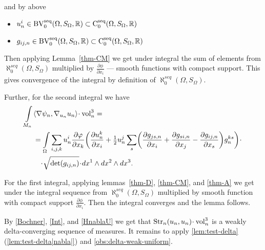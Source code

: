  and by above
 
  \begin{itemize}
  
  \item ${u^i_n}\in  \operatorname{BV_0^{seq}}(\Omega,S_\Omega,\mathbb{R})\subset\operatorname{C_0^{seq}}(\Omega,S_\Omega,\mathbb{R})$ 
 
 \item $g_{i j,n}\in   \operatorname{BV_0^{seq}}(\Omega,S_\Omega,\mathbb{R})\subset \operatorname{C_0^{seq}}(\Omega,S_\Omega,\mathbb{R})$
 
  \end{itemize}
  
Then applying Lemma~\ref{thm-CM} we get under integral the sum of elements from $\aleph_0^{seq}(\Omega,S_\Omega)$ multiplied by $\frac{\partial \phi}{\partial x_i}$ --- smooth functions with compact support.
This gives convergence of the integral by definition of  $\aleph_0^{seq}(\Omega,S_\Omega)$.
              

Further, for the second integral %
we have
\begin{align*}
\int\limits_{M_n}&\<\nabla\psi_n,\nabla_{u_n} u_n\>\cdot\vol^3_n=\\
&=\int\limits_{\Omega}  \sum_{i,j,k}u^i_n \frac{\partial \phi}{\partial x_k}
\biggl(\frac{\partial u^k_n}{\partial x_i} +\tfrac{1}{2}u^j_n\sum_s
\biggl(\frac{\partial g_{ js,n}}{\partial x_i}+\frac{\partial g_{si,n}}{\partial x_j}-\frac{\partial g_{i j,n}}{\partial x_s}\biggr) g^{ks}_n\biggr)\cdot 
\\
&\quad\cdot\sqrt{\op{det}(g_{i j,n})}\cdot dx^1\wedge dx^2\wedge dx^3.
\end{align*}


For the first integral,
 applying
lemmas~\ref{thm-D}, \ref{thm-CM}, and \ref{thm-A} we get under the integral sequence from $\aleph_0^{seq}(\Omega,S_\Omega)$ multiplied by smooth function with compact support $\frac{\partial \phi}{\partial x_i}$. Then the integral converges and the lemma follows.
\qeds

By \ref{Bochner}, \ref{Int}, and \ref{HnablaU} we get that $\Str_n(u_n,u_n)\cdot \vol^3_n$ is a weakly delta-converging sequence of measures.
It remains to apply \ref{lem:test-delta}(\ref{lem:test-delta|nabla|}) and \ref{obs:delta-weak-uniform}.
\qeds
